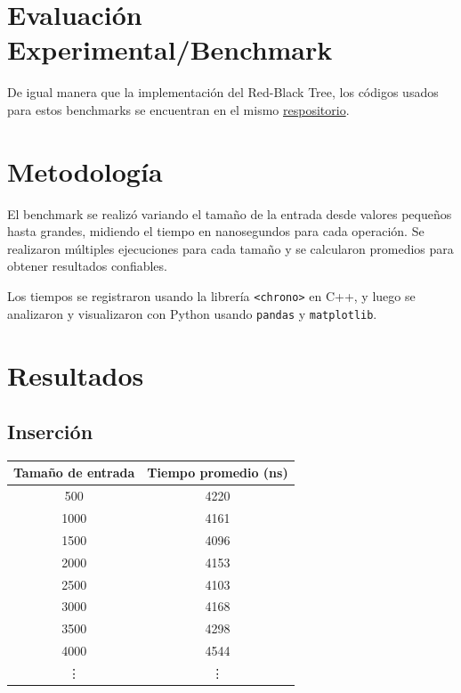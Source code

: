 \documentclass[conference]{IEEEtran}
\begin{document}

\section{Evaluación Experimental/Benchmark}
De igual manera que la implementación del Red-Black Tree, los códigos usados para estos benchmarks se encuentran en el mismo \href{https://github.com/stiffis/aed-exercises/tree/main/proyectRedBlackTree}{respositorio}.
\section{Metodología}

El benchmark se realizó variando el tamaño de la entrada desde valores pequeños hasta grandes, midiendo el tiempo en nanosegundos para cada operación. Se realizaron múltiples ejecuciones para cada tamaño y se calcularon promedios para obtener resultados confiables.

Los tiempos se registraron usando la librería \texttt{<chrono>} en C++, y luego se analizaron y visualizaron con Python usando \texttt{pandas} y \texttt{matplotlib}.

\section{Resultados}

\subsection{Inserción}

\vspace{0.5em}

\begin{center}
\begin{tabular}{cc}
\toprule
\textbf{Tamaño de entrada} & \textbf{Tiempo promedio (ns)} \\
\midrule
500   & 4220 \\
1000  & 4161 \\
1500  & 4096 \\
2000  & 4153 \\
2500  & 4103 \\
3000  & 4168 \\
3500  & 4298 \\
4000  & 4544 \\
\vdots & \vdots \\
\bottomrule
\end{tabular}
\end{center}
\end{document}
